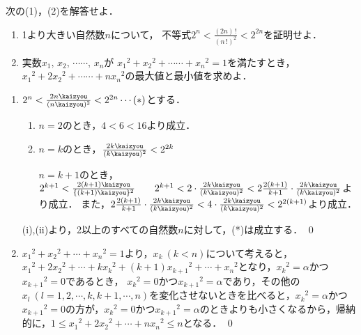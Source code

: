 \begin{problem}
  次の(1)，(2)を解答せよ．
\begin{enumerate}
\item 1より大きい自然数$n$について，
不等式$\displaystyle 2^n<\frac{(2n) \, !}{{(n \, !)}^2}<2^{2n}$を証明せよ．
\item 実数$x_1, \, x_2, \, \cdots\cdots, \, x_n$が
${x_1}^2+{x_2}^2+\cdots\cdots+{x_n}^2=1$を満たすとき，
${x_1}^2+2{x_2}^2+\cdots\cdots+n{x_n}^2$の最大値と最小値を求めよ．
\end{enumerate}
\end{problem}

\begin{enumerate}
  \item $2^n < \frac{{2n}\kaizyou}{({n}\kaizyou)^2} < 2^{2n} \cdots (*)$とする．
  \begin{enumerate}
    \item $n=2$のとき，$4<6<16$より成立．
    \item $n=k$のとき，$\frac{{2k}\kaizyou}{({k}\kaizyou)^2} < 2^{2k}$

    $n=k+1$のとき，$2^{k+1} < \frac{2{(k+1)}\kaizyou}{\{{(k+1)}\kaizyou\}^2} \qquad 2^{k+1}<2\cdot\frac{2{k}\kaizyou}{(k\kaizyou)^2}<2\frac{2(k+1)}{k+1} \cdot \frac{2{k}\kaizyou}{({k}\kaizyou)^2}$より成立．
    また，$2\frac{2(k+1)}{k+1} \cdot \frac{2{k}\kaizyou}{({k}\kaizyou)^2}
    < 4\cdot\frac{2{k}\kaizyou}{({k}\kaizyou)^2} < 2^{2(k+1)}$より成立．
  \end{enumerate}
  (i),(ii)より，2以上のすべての自然数$n$に対して，(*)は成立する． \qed

  \item ${x_1}^2 + {x_2}^2 + \cdots + {x_n}^2 = 1$より，$x_k\ (k<n)$について考えると，${x_1}^2 + 2{x_2}^2 + \cdots + k{x_k}^2 + (k+1){x_{k+1}}^2 + \cdots + {x_n}^2$となり，${x_k}^2 = \alpha$かつ${x_{k+1}}^2 = 0$であるとき，
  ${x_k}^2 = 0$かつ${x_{k+1}}^2 = \alpha$であり，その他の$x_l\ (l=1,2,\cdots,k,k+1,\cdots,n)$を変化させないときを比べると，${x_k}^2 =\alpha$かつ${x_{k+1}}^2 = 0$の方が，${x_k}^2 = 0$かつ${x_{k+1}}^2 = \alpha$のときよりも小さくなるから，帰納的に，$1 \leq {x_1}^2 + 2{x_2}^2 + \cdots + n{x_n}^2 \leq n$となる．
  \qed
\end{enumerate}
